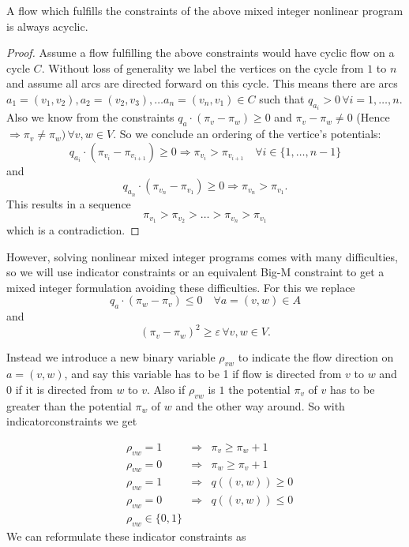 \begin{prop}
 A flow which fulfills the constraints of the above mixed integer nonlinear program is always acyclic.
\end{prop}
\begin{proof}
 Assume a flow fulfilling the above constraints would have cyclic flow on a cycle $C$. Without loss of generality 
we label the vertices on the cycle from $1$ to $n$ and assume all arcs are directed forward on this cycle. This means 
there are arcs $a_1=(v_1,v_2),a_2=(v_2,v_3), \dots a_n=(v_n, v_1)\in C$ such that $q_{a_i} > 0 \,\forall i={1,\dots , 
n}$. Also we know from the constraints  $q_a\cdot (\pi_v -\pi_w)\ge 0$ and $\pi_v - \pi_w \neq 0$ (Hence $\Rightarrow 
\pi_v\neq\pi_w)\, \forall v,w\in V$. So we conclude an ordering of the vertice's potentials: 
$$q_{a_i}\cdot (\pi_{v_i} -\pi_{v_{i+1}})\ge 0 \Rightarrow \pi_{v_i}>\pi_{v_{i+1}}\quad\forall i\in\{1,\dots ,n-1\}$$ 
and 
$$q_{a_n}\cdot (\pi_{v_n} -\pi_{v_1})\ge 0 \Rightarrow \pi_{v_n}>\pi_{v_1}.$$ 
This results in a sequence $$\pi_{v_1}>\pi_{v_2}>\dots >\pi_{v_n}>\pi_{v_1}$$ which is a contradiction. \Lightning
\end{proof}

However, solving nonlinear mixed integer programs comes with many difficulties, so we will use indicator constraints 
or an equivalent Big-M constraint to get a mixed integer formulation avoiding these difficulties. For this we  replace 
$$q_a\cdot (\pi_w -\pi_v)\le 0 \quad\forall a=(v,w)\in A $$ and 
$$(\pi_v - \pi_w)^2 \ge \varepsilon \,\forall v,w \in V.$$

Instead we introduce a new binary variable $\rho_{vw}$ to indicate the flow direction on $a=(v,w)$, and say this 
variable has to be 1 if flow is directed from $v$ to $w$ and 0 if it is directed from $w$ to $v$. Also if $\rho_{vw}$ 
is $1$ the potential $\pi_v$ of $v$ has to be greater than the potential $\pi_w$ of $w$ and the other way around. So 
with indicatorconstraints we get 

\begin{align*}
 &\rho_{vw}=1 &\Rightarrow &\pi_v\ge\pi_w +1\\
 &\rho_{vw}=0 &\Rightarrow &\pi_w\ge\pi_v +1\\
 &\rho_{vw}=1 &\Rightarrow &q((v,w))\ge 0\\
 &\rho_{vw}=0 &\Rightarrow &q((v,w))\le 0\\
 &\rho_{vw} \in \{0,1\}&&
\end{align*}
We can reformulate these indicator constraints as

